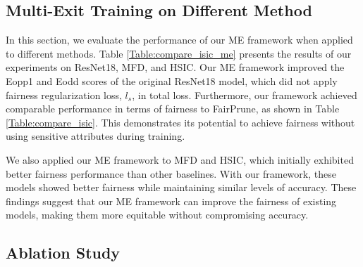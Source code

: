 
\subsection{Multi-Exit Training on Different Method}
\label{ME_different_baseline}
In this section, we evaluate the performance of our ME framework when applied to different methods. Table \ref{Table:compare_isic_me} presents the results of our experiments on ResNet18, MFD, and HSIC. Our ME framework improved the Eopp1 and Eodd scores of the original ResNet18 model, which did not apply fairness regularization loss, $l_s$, in total loss. Furthermore, our framework achieved comparable performance in terms of fairness to FairPrune, as shown in Table \ref{Table:compare_isic}. This demonstrates its potential to achieve fairness without using sensitive attributes during training.

We also applied our ME framework to MFD and HSIC, which initially exhibited better fairness performance than other baselines. With our framework, these models showed better fairness while maintaining similar levels of accuracy. These findings suggest that our ME framework can improve the fairness of existing models, making them more equitable without compromising accuracy.


\subsection{Ablation Study}




